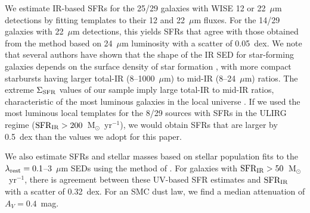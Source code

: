 \documentclass[apj]{emulateapj}
\newcommand{\msun}{M$_{\odot}$}
\newcommand{\lrest}{\lambda_{\textnormal{\scriptsize{rest}}}}
\newcommand{\sigmasfr}{\Sigma_{\textnormal{\scriptsize{SFR}}}}
\newcommand{\sfrir}{\textnormal{SFR}_{\textnormal{\scriptsize{IR}}}}
\begin{document}

We estimate IR-based SFRs for the 25/29 galaxies with WISE 12 or
22~$\mu$m detections by fitting \citet{cha01} templates to their 12
and 22~$\mu$m fluxes.  For the 14/29 galaxies with 22~$\mu$m
detections, this yields SFRs that agree with those obtained from the
\citet{ruj12} method based on 24~$\mu$m luminosity with a scatter of
0.05~dex.  We note that several authors have shown that the shape of
the IR SED for star-forming galaxies depends on the surface density of
star formation \citep[e.g.,][]{ruj11,elb11}, with more compact
starbursts having larger total-IR (8--1000~$\mu$m) to mid-IR
(8--24~$\mu$m) ratios.  The extreme $\sigmasfr$ values of our sample
imply large total-IR to mid-IR ratios, characteristic of the most
luminous galaxies in the local universe \citep[e.g.,][]{rie09}.  If we
used the most luminous local templates for the 8/29 sources with SFRs
in the ULIRG regime ($\sfrir>200$~\msun~yr$^{-1}$), we would obtain
SFRs that are larger by 0.5~dex than the values we adopt for this
paper.

We also estimate SFRs and stellar masses based on stellar population
fits to the $\lrest=0.1$--3~$\mu$m SEDs using the method of
\citet{mou11}.  For galaxies with $\sfrir>50$~\msun~yr$^{-1}$, there
is agreement between these UV-based SFR estimates and $\sfrir$ with a
scatter of 0.32~dex.  For an SMC dust law, we find a median
attenuation of $A_V=0.4$~mag.
\end{document}
